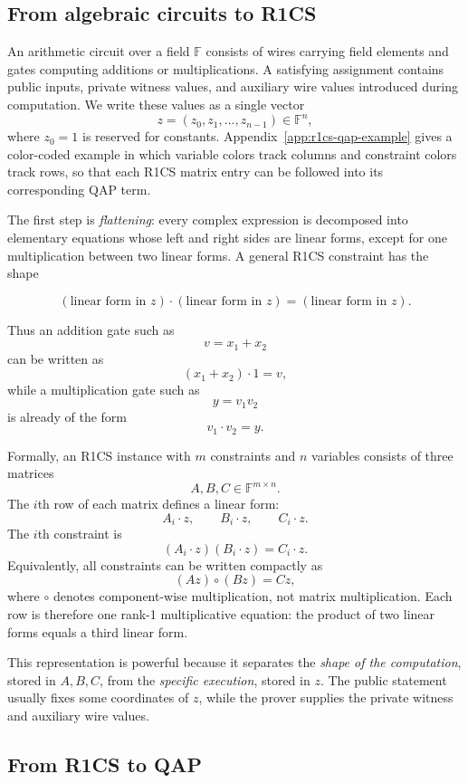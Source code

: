 \documentclass[11pt]{article}
\newcommand{\F}{\mathbb{F}}
\begin{document}
\subsection{From algebraic circuits to R1CS}

An arithmetic circuit over a field $\F$ consists of wires carrying field elements and gates computing additions or multiplications. A satisfying assignment contains public inputs, private witness values, and auxiliary wire values introduced during computation. We write these values as a single vector
\[
    z=(z_0,z_1,\ldots,z_{n-1})\in\F^n,
\]
where $z_0=1$ is reserved for constants. Appendix~\ref{app:r1cs-qap-example} gives a color-coded example in which variable colors track columns and constraint colors track rows, so that each R1CS matrix entry can be followed into its corresponding QAP term.

The first step is \emph{flattening}: every complex expression is decomposed into elementary equations whose left and right sides are linear forms, except for one multiplication between two linear forms. A general R1CS constraint has the shape
\begin{tcolorbox}
\[
    (\text{linear form in }z)\cdot(\text{linear form in }z)
    =
    (\text{linear form in }z).
\]
\end{tcolorbox}
Thus an addition gate such as
\[
    v=x_1+x_2
\]
can be written as
\[
    (x_1+x_2)\cdot 1=v,
\]
while a multiplication gate such as
\[
    y=v_1v_2
\]
is already of the form
\[
    v_1\cdot v_2=y.
\]

Formally, an R1CS instance with $m$ constraints and $n$ variables consists of three matrices
\[
    A,B,C\in\F^{m\times n}.
\]
The $i$th row of each matrix defines a linear form:
\[
    A_i\cdot z,
    \qquad
    B_i\cdot z,
    \qquad
    C_i\cdot z.
\]
The $i$th constraint is
\[
    (A_i\cdot z)(B_i\cdot z)=C_i\cdot z.
\]
Equivalently, all constraints can be written compactly as
\[
    (Az)\circ(Bz)=Cz,
\]
where $\circ$ denotes component-wise multiplication, not matrix multiplication. Each row is therefore one rank-1 multiplicative equation: the product of two linear forms equals a third linear form.

This representation is powerful because it separates the \emph{shape of the computation}, stored in $A,B,C$, from the \emph{specific execution}, stored in $z$. The public statement usually fixes some coordinates of $z$, while the prover supplies the private witness and auxiliary wire values.

\subsection{From R1CS to QAP}
\end{document}
